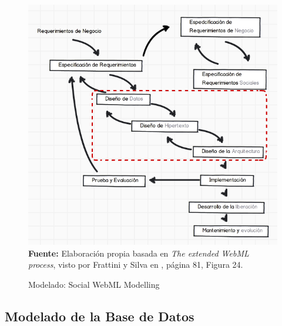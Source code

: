 \documentclass[oneside,12pt,a4paper]{memoir}%
\begin{document}
	\begin{figure}[here]
		\centering
		\caption{Modelado: Social WebML Modelling}
		\includegraphics[width=1.0\textwidth]{figure/fig_SocialWebMLModelado.PNG}
			\newline
			\textbf{Fuente:} Elaboraci\'on propia basada en \textit{The extended WebML
			process}, visto por Frattini y Silva en \cite{Frattini2007}, p\'agina 81,
			Figura 24.
		\label{fig:SocialWebMLModelling}
	\end{figure}
	
		
		\subsection{Modelado de la Base de Datos}
		\label{sec:proposalDB}
		
\end{document}
